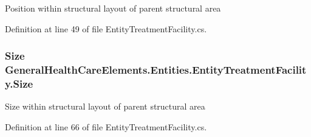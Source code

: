 Position within structural layout of parent structural area 



Definition at line 49 of file Entity\+Treatment\+Facility.\+cs.

\subsubsection[{\texorpdfstring{Size}{Size}}]{\setlength{\rightskip}{0pt plus 5cm}Size General\+Health\+Care\+Elements.\+Entities.\+Entity\+Treatment\+Facility.\+Size\hspace{0.3cm}{\ttfamily [get]}}\hypertarget{class_general_health_care_elements_1_1_entities_1_1_entity_treatment_facility_a6f9e7fc7343f99d15f9bd18667dff61f}{}\label{class_general_health_care_elements_1_1_entities_1_1_entity_treatment_facility_a6f9e7fc7343f99d15f9bd18667dff61f}


Size within structural layout of parent structural area 



Definition at line 66 of file Entity\+Treatment\+Facility.\+cs.

